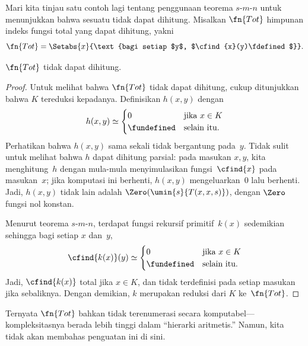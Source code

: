 \documentclass[../../../include/open-logic-section]{subfiles}
\begin{document}

Mari kita tinjau satu contoh lagi tentang penggunaan teorema $s$-$m$-$n$
untuk menunjukkan bahwa sesuatu tidak dapat dihitung. Misalkan $\fn{Tot}$
himpunan indeks fungsi total yang dapat dihitung, yakni
\[
\fn{Tot} = \Setabs{x}{\text{bagi setiap $y$, $\cfind{x}(y)\fdefined$}}.
\]

\begin{prop}
$\fn{Tot}$ tidak dapat dihitung.
\end{prop}

\begin{proof}
Untuk melihat bahwa $\fn{Tot}$ tidak dapat dihitung, cukup ditunjukkan bahwa
$K$ tereduksi kepadanya. Definisikan $h(x,y)$ dengan
\[
h(x,y) \simeq
\begin{cases}
0 & \text{jika $x \in K$} \\
\fundefined & \text{selain itu.}
\end{cases}
\]
Perhatikan bahwa $h(x,y)$ sama sekali tidak bergantung pada~$y$. Tidak sulit
untuk melihat bahwa $h$ dapat dihitung parsial: pada masukan $x,y$, kita
menghitung~$h$ dengan mula-mula menyimulasikan fungsi~$\cfind{x}$ pada
masukan~$x$; jika komputasi ini berhenti, $h(x,y)$ mengeluarkan~$0$ lalu
berhenti. Jadi, $h(x,y)$ tidak lain adalah
$\Zero(\umin{s}{T(x,x,s)})$, dengan $\Zero$ fungsi nol konstan.

Menurut teorema $s$-$m$-$n$, terdapat fungsi rekursif primitif~$k(x)$
sedemikian sehingga bagi setiap $x$ dan~$y$,
\[
\cfind{k(x)}(y) \simeq
\begin{cases}
0 & \text{jika $x \in K$} \\
\fundefined & \text{selain itu.}
\end{cases}
\]
Jadi, $\cfind{k(x)}$ total jika $x \in K$, dan tidak terdefinisi pada setiap
masukan jika sebaliknya. Dengan demikian, $k$ merupakan reduksi dari $K$
ke~$\fn{Tot}$.
\end{proof}

\begin{digress}
Ternyata $\fn{Tot}$ bahkan tidak terenumerasi secara komputabel---kompleksitasnya
berada lebih tinggi dalam ``hierarki aritmetis.'' Namun, kita tidak akan
membahas penguatan ini di sini.
\end{digress}
\end{document}

